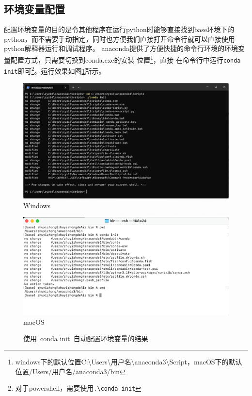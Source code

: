 \documentclass[UTF8]{ctexart}
\begin{document}
\subsection{环境变量配置}
配置环境变量的目的是令其他程序在运行python时能够直接找到base环境下的python，而不需要手动指定，同时也方便我们直接打开命令行就可以直接使用python解释器运行和调试程序。
anaconda提供了方便快捷的命令行环境的环境变量配置方式，只需要切换到conda.exe的安装
位置\footnote{windows下的默认位置C:\textbackslash Users\textbackslash 用户名\textbackslash anaconda3\textbackslash Script，macOS下的默认位置/Users/用户名/anaconda3/bin}，直接
在命令行中运行{\texttt{conda init}}即可\footnote{对于powershell，需要使用\texttt{.\textbackslash conda init}}。运行效果如图\ref{fig:condaInit}所示。
\begin{figure}[htbp]
    \begin{minipage}[t]{0.4\linewidth}
        \centering
        \includegraphics[height=0.5\linewidth]{pic/conda_init_windows.png}
        Windows
    \end{minipage}
    \hfill
    \begin{minipage}[t]{0.4\linewidth}
        \centering
        \includegraphics[height=0.5\linewidth]{pic/conda_init_macos.png}
        macOS
    \end{minipage}
    \hfill
    \caption{使用~conda init~自动配置环境变量的结果}
    \label{fig:condaInit}
\end{figure}
\end{document}
